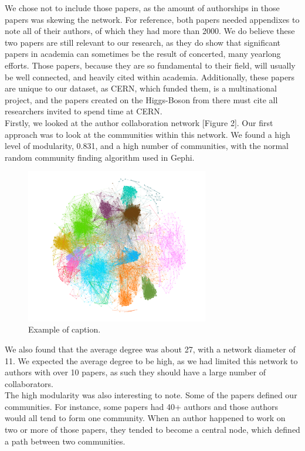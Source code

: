 \documentclass[times, 10pt,twocolumn]{article}
\begin{document}
We chose not to include those papers, as the amount of authorships in those papers was skewing the network. For reference, both papers needed appendixes to note all of their authors, of which they had more than 2000. We do believe these two papers are still relevant to our research, as they do show that significant papers in academia can sometimes be the result of concerted, many yearlong efforts. Those papers, because they are so fundamental to their field, will usually be well connected, and heavily cited within academia. Additionally, these papers are unique to our dataset, as CERN, which funded them, is a multinational project, and the papers created on the Higgs-Boson from there must cite all researchers invited to spend time at CERN.\\

Firstly, we looked at the author collaboration network [Figure 2]. Our first approach was to look at the communities within this network. We found a high level of modularity, 0.831, and a high number of communities, with the normal random community finding algorithm used in Gephi.

\begin{figure}[h]
   \includegraphics[width=8cm]{figure2.png}
   \caption{Example of caption.}
\end{figure}

We also found that the average degree was about 27, with a network diameter of 11. We expected the average degree to be high, as we had limited this network to authors with over 10 papers, as such they should have a large number of collaborators. \\

The high modularity was also interesting to note. Some of the papers defined our communities. For instance, some papers had 40+ authors and those authors would all tend to form one community. When an author happened to work on two or more of those papers, they tended to become a central node, which defined a path between two communities. \\
\end{document}
